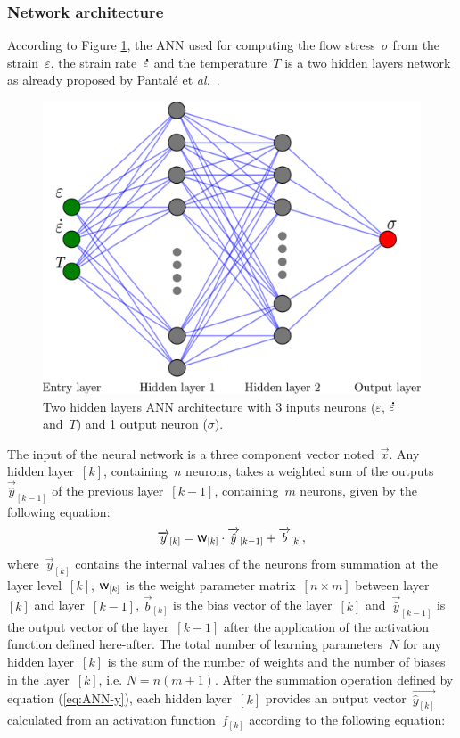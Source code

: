 \documentclass[algorithms,article,submit,pdftex,oneauthors]{Definitions/mdpi}
\makeatletter
\DeclareRobustCommand{\w}{\mbox{\large\ensuremath{\mathsf{w}}}}
\DeclareRobustCommand{\lay}[1]{_{[#1]}}
\DeclareRobustCommand{\Lay}[1]{\mbox{$[#1]$}}
\DeclareRobustCommand{\mdot}[1]{\accentset{\mbox{\bfseries .}}{#1}}
\DeclareRobustCommand{\eal}{et \emph{al.}\@\xspace}
\makeatother
\begin{document}
\subsubsection{Network architecture}\label{subsubsec:ANN-arch}
According to Figure \ref{fig:ANN-2HL}, the ANN used for computing the flow stress~$\sigma$ from the strain~$\varepsilon$, the strain rate~$\mdot{\varepsilon}$ and the temperature~$T$ is a two hidden layers network as already proposed by Pantalé \eal~\cite{Pantale-2021-EIN, Pantale-2023-DIA}.
\begin{figure}[h]
\centering
\includegraphics[width=0.55\columnwidth]{Figures/ANN-2HL}
\caption{Two hidden layers ANN architecture with 3 inputs neurons ($\varepsilon$, $\mdot{\varepsilon}$ and~$T$) and 1 output neuron ($\sigma$).}
\label{fig:ANN-2HL}
\end{figure}
The input of the neural network is a three component vector noted~$\overrightarrow{x}$.
Any hidden layer~\Lay{k}, containing~$n$ neurons, takes a weighted sum of the outputs~$\overrightarrow{\hat{y}}\lay{k-1}$ of the previous layer~\Lay{k-1}, containing~$m$ neurons, given by the following equation:
\begin{equation}
\overrightarrow{y}\lay{k} = \w\lay{k} \cdot \overrightarrow{\hat{y}}\lay{k-1}+ \overrightarrow{b}\lay{k}\label{eq:ANN-y},
\end{equation}
where~$\overrightarrow{y}\lay{k}$ contains the internal values of the neurons from summation at the layer level~\Lay{k}, $\w\lay{k}$ is the weight parameter matrix~$[n\times m]$ between layer~\Lay{k} and layer~\Lay{k-1}, $\overrightarrow{b}\lay{k}$ is the bias vector of the layer~\Lay{k} and~$\overrightarrow{\hat{y}}\lay{k-1}$ is the output vector of the layer~\Lay{k-1} after the application of the activation function defined here-after.
The total number of learning parameters~$N$ for any hidden layer~\Lay{k} is the sum of the number of weights and the number of biases in the layer~\Lay{k}, i.e. $N=n(m+1)$.
After the summation operation defined by equation (\ref{eq:ANN-y}), each hidden layer~\Lay{k} provides an output vector~$\overrightarrow{\hat{y}\lay{k}}$ calculated from an activation function~$f\lay{k}$ according to the following equation:
\end{document}
